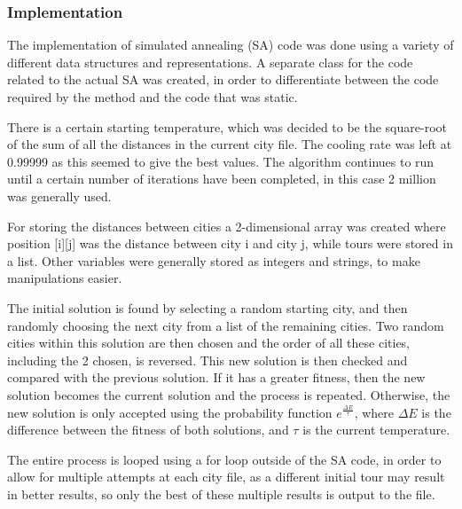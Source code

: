 \documentclass[11pt]{article}
\begin{document}
		\subsubsection*{Implementation}
			The implementation of simulated annealing (SA) code was done using a variety of different data structures and representations. A separate class for the code related to the actual SA was created, in order to differentiate between the code required by the method and the code that was static.
			\par
			There is a certain starting temperature, which was decided to be the square-root of the sum of all the distances in the current city file. The cooling rate was left at 0.99999 as this seemed to give the best values. The algorithm continues to run until a certain number of iterations have been completed, in this case 2 million was generally used.
			\par
			For storing the distances between cities a 2-dimensional array was created where position [i][j] was the distance between city i and city j, while tours were stored in a list. Other variables were generally stored as integers and strings, to make manipulations easier.
			\par
			The initial solution is found by selecting a random starting city, and then randomly choosing the next city from a list of the remaining cities. Two random cities within this solution are then chosen and the order of all these cities, including the 2 chosen, is reversed. This new solution is then checked and compared with the previous solution. If it has a greater fitness, then the new solution becomes the current solution and the process is repeated. Otherwise, the new solution is only accepted using the probability function
			$ e^{\frac{\Delta E}{\tau}} $, where $ \Delta E $ is the difference between the fitness of both solutions, and $ \tau $ is the current temperature.
			\par
			The entire process is looped using a for loop outside of the SA code, in order to allow for multiple attempts at each city file, as a different initial tour may result in better results, so only the best of these multiple results is output to the file.
\end{document}
